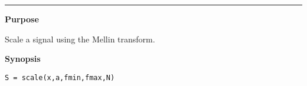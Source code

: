 

\renewcommand{\footnoterule}{}
\hspace*{-1.6cm}{\Large \bf scale}

\vspace*{-.4cm}
\hspace*{-1.6cm}\rule[0in]{16.5cm}{.02cm}
\vspace*{.2cm}



{\bf \large {}\selectfont Purpose}\\
\hspace*{1.5cm}
\begin{minipage}[t]{13.5cm}
Scale a signal using the Mellin transform.
\end{minipage}
\vspace*{.2cm}


{\bf \large {}\selectfont Synopsis}\\
\hspace*{1.5cm}
\begin{minipage}[t]{13.5cm}
\begin{verbatim}
S = scale(x,a,fmin,fmax,N)
\end{verbatim}
\end{minipage}
\vspace*{.3cm}


